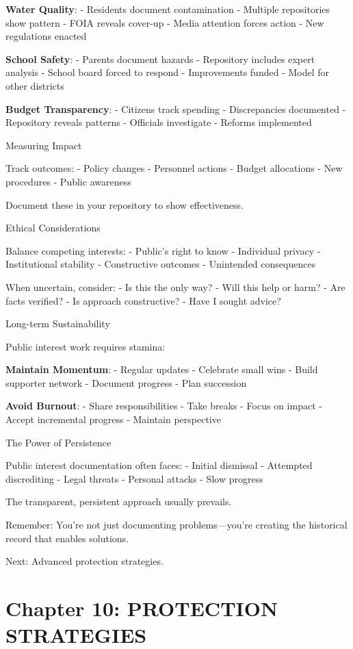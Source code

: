 \textbf{Water Quality}: - Residents document contamination - Multiple
repositories show pattern - FOIA reveals cover-up - Media attention
forces action - New regulations enacted

\textbf{School Safety}: - Parents document hazards - Repository includes
expert analysis - School board forced to respond - Improvements funded -
Model for other districts

\textbf{Budget Transparency}: - Citizens track spending - Discrepancies
documented - Repository reveals patterns - Officials investigate -
Reforms implemented

Measuring Impact

Track outcomes: - Policy changes - Personnel actions - Budget
allocations - New procedures - Public awareness

Document these in your repository to show effectiveness.

Ethical Considerations

Balance competing interests: - Public's right to know - Individual
privacy - Institutional stability - Constructive outcomes - Unintended
consequences

When uncertain, consider: - Is this the only way? - Will this help or
harm? - Are facts verified? - Is approach constructive? - Have I sought
advice?

Long-term Sustainability

Public interest work requires stamina:

\textbf{Maintain Momentum}: - Regular updates - Celebrate small wins -
Build supporter network - Document progress - Plan succession

\textbf{Avoid Burnout}: - Share responsibilities - Take breaks - Focus
on impact - Accept incremental progress - Maintain perspective

The Power of Persistence

Public interest documentation often faces: - Initial dismissal -
Attempted discrediting - Legal threats - Personal attacks - Slow
progress

The transparent, persistent approach usually prevails.

Remember: You're not just documenting problems---you're creating the
historical record that enables solutions.

Next: Advanced protection strategies.

\section{Chapter 10: PROTECTION
STRATEGIES}\label{chapter-10-protection-strategies}


